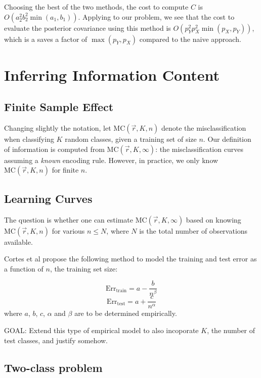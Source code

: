 \documentclass[12pt]{article}
\begin{document}
Choosing the best of the two methods, the cost to compute $C$ is $O(a_2^2 b_2^2 \min(a_1, b_1))$.
Applying to our problem, we see that the cost to evaluate the posterior covariance using this method is $O(p_Y^2 p_X^2 \min(p_X, p_Y))$, which is a saves a factor of $\max(p_Y, p_X)$ compared to the naive approach.


\section{Inferring Information Content}

\subsection{Finite Sample Effect}

Changing slightly the notation, let $\text{MC}(\vec{r}, K, n)$ denote
the misclassification when classifying $K$ random classes, given a
training set of size $n$.  Our definition of information is computed
from $\text{MC}(\vec{r}, K, \infty)$: the misclassification curves
assuming a \emph{known} encoding rule.  However, in practice, we only
know $\text{MC}(\vec{r}, K, n)$ for finite $n$.

\subsection{Learning Curves}

The question is whether one can estimate $\text{MC}(\vec{r},
K, \infty)$ based on knowing $\text{MC}(\vec{r}, K, n)$ for various
$n \leq N$, where $N$ is the total number of observations available.

Cortes et al propose the following method to model the training and
test error as a function of $n$, the training set size:

\[
\text{Err}_{\text{train}} = a - \frac{b}{n^\beta}
\]
\[
\text{Err}_{\text{test}} = a + \frac{c}{n^\alpha}
\]
where $a$, $b$, $c$, $\alpha$ and $\beta$ are to be determined
empirically.

GOAL: Extend this type of empirical model to also incoporate $K$, the
number of test classes, and justify somehow.

\subsection{Two-class problem}
\end{document}
